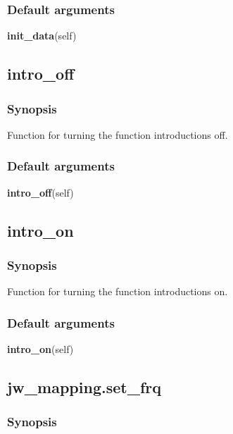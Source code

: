 \subsubsection{Default arguments}

\textsf{\textbf{init\_data}(self)}



\newpage

\subsection{intro\_off}


\subsubsection{Synopsis}

Function for turning the function introductions off.

\subsubsection{Default arguments}

\textsf{\textbf{intro\_off}(self)}



\newpage

\subsection{intro\_on}


\subsubsection{Synopsis}

Function for turning the function introductions on.

\subsubsection{Default arguments}

\textsf{\textbf{intro\_on}(self)}



\newpage

\subsection{jw\_mapping.set\_frq}


\subsubsection{Synopsis}

